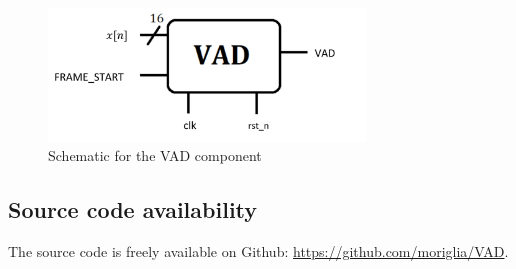 \begin{figure}[]
  \centering
  \includegraphics[width=0.75\textwidth]{figs/vad_schematic.png}
  \caption{Schematic for the VAD component}
  \label{fig:schematic}
\end{figure}

\subsection{Source code availability}
The source code is freely available on Github: \url{https://github.com/moriglia/VAD}.